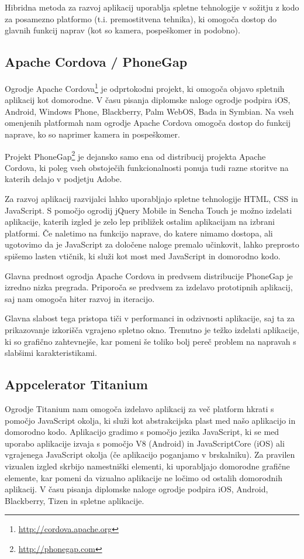 Hibridna metoda za razvoj aplikacij uporablja spletne tehnologije v sožitju z kodo za posamezno platformo (t.i. premostitvena tehnika), ki omogoča dostop do glavnih funkcij naprav (kot so kamera, pospeškomer in podobno).

\subsection{Apache Cordova / PhoneGap}

Ogrodje Apache Cordova\footnote{\href{http://cordova.apache.org}{http://cordova.apache.org}} je odprtokodni projekt, ki omogoča objavo spletnih aplikacij kot domorodne. V času pisanja diplomske naloge ogrodje podpira iOS, Android, Windows Phone, Blackberry, Palm WebOS, Bada in Symbian. Na vseh omenjenih platformah nam ogrodje Apache Cordova omogoča dostop do funkcij naprave, ko so naprimer kamera in pospeškomer. 

Projekt PhoneGap\footnote{\href{http://phonegap.com}{http://phonegap.com}} je dejansko samo ena od distribucij projekta Apache Cordova, ki poleg vseh obstoječih funkcionalnosti ponuja tudi razne storitve na katerih delajo v podjetju Adobe.

Za razvoj aplikacij razvijalci lahko uporabljajo spletne tehnologije HTML, CSS in JavaScript. S pomočjo ogrodij jQuery Mobile in Sencha Touch je možno izdelati aplikacije, katerih izgled je zelo lep približek ostalim aplikacijam na izbrani platformi. Če naletimo na funkcijo naprave, do katere nimamo dostopa, ali ugotovimo da je JavaScript za določene naloge premalo učinkovit, lahko preprosto spišemo lasten vtičnik, ki služi kot most med JavaScript in domorodno kodo.

Glavna prednost ogrodja Apache Cordova in predvsem distribucije PhoneGap je izredno nizka pregrada. Priporoča se predvsem za izdelavo prototipnih aplikacij, saj nam omogoča hiter razvoj in iteracijo.

Glavna slabost tega pristopa tiči v performanci in odzivnosti aplikacije, saj ta za prikazovanje izkorišča vgrajeno spletno okno. Trenutno je težko izdelati aplikacije, ki so grafično zahtevnejše, kar pomeni še toliko bolj pereč problem na napravah s slabšimi karakteristikami.

\subsection{Appcelerator Titanium}

Ogrodje Titanium nam omogoča izdelavo aplikacij za več platform hkrati s pomočjo JavaScript okolja, ki služi kot abstrakcijska plast med našo aplikacijo in domorodno kodo. Aplikacijo gradimo s pomočjo jezika JavaScript, ki se med uporabo aplikacije izvaja s pomočjo V8 (Android) in JavaScriptCore (iOS) ali vgrajenega JavaScript okolja (če aplikacijo poganjamo v brskalniku). Za pravilen vizualen izgled skrbijo namestniški elementi, ki uporabljajo domorodne grafične elemente, kar pomeni da vizualno aplikacije ne ločimo od ostalih domorodnih aplikacij. V času pisanja diplomske naloge ogrodje podpira iOS, Android, Blackberry, Tizen in spletne aplikacije.

